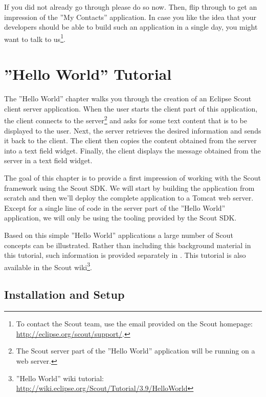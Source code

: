 \documentclass[a4paper,10pt,twoside]{book}
\begin{document}
If you did not already go through  please do so now. 
Then, flip through  to get an impression of the ''My Contacts'' application. 
In case you like the idea that your developers should be able to build such an application in a single day, you might want to talk to us\footnote{
To contact the Scout team, use the email provided on the Scout homepage: \url{http://eclipse.org/scout/support/}.
}.

\chapter{''Hello World'' Tutorial}

The ''Hello World'' chapter walks you through the creation of an Eclipse Scout client server application.
When the user starts the client part of this application, the client connects to the server\footnote{
The Scout server part of the ''Hello World'' application will be running on a web server.
} 
and asks for some text content that is to be displayed to the user.
Next, the server retrieves the desired information and sends it back to the client.
The client then copies the content obtained from the server into a text field widget.
Finally, the client displays the message obtained from the server in a text field widget.

The goal of this chapter is to provide a first impression of working with the Scout framework using the Scout SDK.
We will start by building the application from scratch and then we'll deploy the complete application to a Tomcat web server.
Except for a single line of code in the server part of the ''Hello World'' application, we will only be using the tooling provided by the Scout SDK.

Based on this simple ''Hello World'' applications a large number of Scout concepts can be illustrated.
Rather than including this background material in this tutorial, such information is provided separately in .
This tutorial is also available in the Scout wiki\footnote{
''Hello World'' wiki tutorial: \url{http://wiki.eclipse.org/Scout/Tutorial/3.9/HelloWorld}
}.

\section{Installation and Setup}
\end{document}

